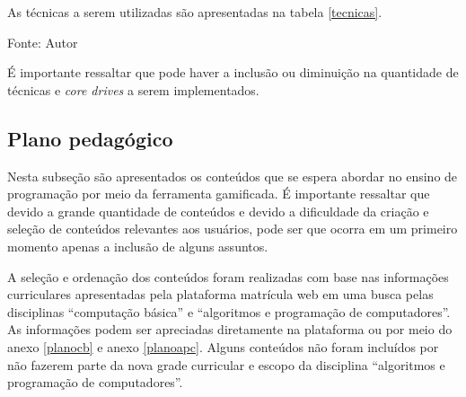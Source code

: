 As técnicas a serem utilizadas são apresentadas na tabela \ref{tecnicas}.


\begin{table}[h]
	\centering
	\caption{Técnicas a serem utilizadas.}
	\label{tecnicas}
	Fonte: Autor
\end{table}

É importante ressaltar que pode haver a inclusão ou diminuição na quantidade de técnicas e \textit{core drives} a serem implementados.



\subsection{Plano pedagógico}

Nesta subseção são apresentados os conteúdos que se espera abordar no ensino de programação por meio da ferramenta gamificada. É importante  
ressaltar que devido a grande quantidade de conteúdos e devido a dificuldade da criação e seleção de conteúdos relevantes aos usuários, pode 
ser que ocorra em um primeiro momento apenas a inclusão de alguns assuntos. 

A seleção e ordenação dos conteúdos foram realizadas com base nas informações curriculares apresentadas pela plataforma matrícula web em uma 
busca pelas disciplinas “computação básica” e “algoritmos e programação de computadores”. As informações podem ser apreciadas diretamente na 
plataforma ou por meio do anexo \ref{planocb} e anexo \ref{planoapc}. Alguns conteúdos não foram incluídos por não fazerem parte da nova grade curricular e escopo da 
disciplina “algoritmos e programação de computadores”.

